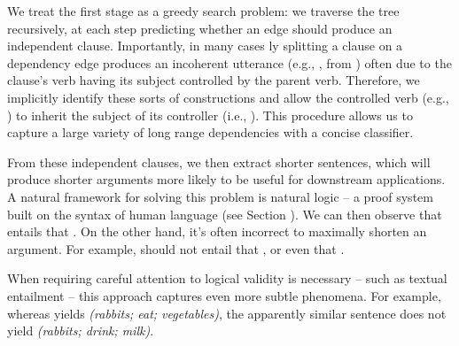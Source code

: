We treat the first stage as a greedy search problem: we traverse
  the tree recursively, at each step predicting whether an edge should
  produce an independent clause.
Importantly, in many cases \naive ly splitting a clause on a dependency
  edge produces an incoherent utterance (e.g., ,
  from ) often due to the clause's verb having its subject 
  controlled by the parent verb.
Therefore, we implicitly identify these sorts of constructions
  and allow the controlled verb (e.g., ) to inherit the subject 
  of its controller (i.e., ).
This procedure allows us to capture a large variety of long range 
  dependencies with a concise classifier.
 
From these independent clauses, we then extract shorter sentences, which
  will produce shorter arguments more likely to be useful for downstream
  applications.
A natural framework for solving this problem is natural logic -- 
  a proof system built on the syntax of human language (see Section ).
We can then observe that
   entails
  that .
On the other hand, it's often incorrect to maximally shorten an argument.
For example,  should not entail that
  , or even that .

When requiring careful attention to logical validity is necessary -- such as 
  textual entailment -- this approach captures even more subtle phenomena.
For example, whereas  yields
  \textit{(rabbits; eat; vegetables)}, the apparently similar sentence
   does not yield
  \textit{(rabbits; drink; milk)}.

